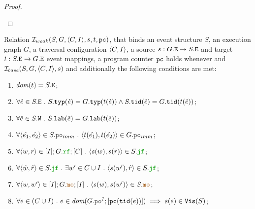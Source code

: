 \documentclass[12pt]{article}
\begin{document}
\begin{proof}
\begin{itemize}

    
  \end{itemize}
  
\end{proof}

\begin{definition}
  Relation $\mathcal{I}_{weak}(S, G, \langle C, I \rangle, s, t, {\mathtt{pc}})$, that binds an 
  event structure $S$, an \imm execution graph $G$,
  a traversal configuration $\langle C, I \rangle$,
  a source $s : G.{\mathtt{E}} \rightarrow S.{\mathtt{E}}$ and target $t : S.{\mathtt{E}} \rightarrow G.{\mathtt{E}}$ event mappings,
  a program counter ${\mathtt{pc}}$
  holds whenever and $\mathcal{I}_{base}(S, G, \langle C, I \rangle, s)$ and
  additionally the following conditions are met:
  \begin{enumerate}[label=\textbf{S.\arabic*},start=5]
    \item \label{item:sim-dom-t}
      $\textit{dom}{({t})} = S.{\mathtt{E}}$;
    \item \label{item:sim-typ-tid}
      $\forall{\hat{e} \in S.{\mathtt{E}}} ~.~
      S.{\mathtt{typ}}(\hat{e}) = G.{\mathtt{typ}}(t(\hat{e})) \wedge
      S.{\mathtt{tid}}(\hat{e}) = G.{\mathtt{tid}}(t(\hat{e}))
      $;
    \item \label{item:sim-lab-tw}
      $\forall{\hat{e} \in S.{\mathtt{W}}} ~.~ S.{\mathtt{lab}}(\hat{e}) = G.{\mathtt{lab}}(t(\hat{e}))$;
    \item \label{item:sim-po-imm}
      $\forall{\tup{\hat{e_1}, \hat{e_2}} \in S.\lPO_{imm}} ~.~
       \tup{t(\hat{e_1}), t(\hat{e_2})} \in G.\lPO_{imm}$;
    \item \label{item:sim-rf} 
      $\forall{\tup{w, r} \in [\lI];\lG.\lRF;[\lC]} ~.~ \tup{s(w), s(r)} \in \lES.\lJF$;
    \item \label{item:sim-jf}
      $
      \forall{\tup{\hat{w}, \hat{r}} \in \lES.\lJF} ~.~
      \exists{w' \in \lC \cup \lI} ~.~ \tup{s(w'), \hat{r}} \in \lES.\lJF
      $;
    \item \label{item:sim-mo}
      $\forall{\tup{w, w'} \in [\lI];\lG.\lMO;[\lI]} ~.~ \tup{s(w), s(w')} \in \lES.\lMO$;
      
    \item \label{item:sim-vis}
      $\forall{e \in (C \cup I)} ~.~
      e \in \dom{G.\lPO^?;[\lPC(\lTID(e))]} \implies s(e) \in \lVIS(S)$;
  \end{enumerate}
\end{definition}
\end{document}
